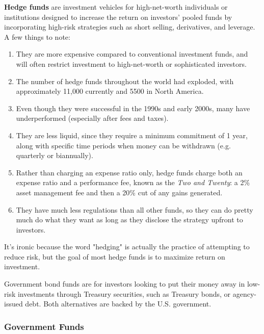 \documentclass{article}
\begin{document}
      \begin{definition}
        \textbf{Hedge funds} are investment vehicles for high-net-worth individuals or institutions designed to increase the return on investors' pooled funds by incorporating high-risk strategies such as short selling, derivatives, and leverage. A few things to note: 
        \begin{enumerate}
          \item They are more expensive compared to conventional investment funds, and will often restrict investment to high-net-worth or sophisticated investors. 
          \item The number of hedge funds throughout the world had exploded, with approximately 11,000 currently and 5500 in North America. 
          \item Even though they were successful in the 1990s and early 2000s, many have underperformed (especially after fees and taxes). 
          \item They are less liquid, since they require a minimum commitment of 1 year, along with specific time periods when money can be withdrawn (e.g. quarterly or biannually). 
          \item Rather than charging an expense ratio only, hedge funds charge both an expense ratio and a performance fee, known as the \textit{Two and Twenty}: a 2\% asset management fee and then a 20\% cut of any gains generated. 
          \item They have much less regulations than all other funds, so they can do pretty much do what they want as long as they disclose the strategy upfront to investors. 
        \end{enumerate}
        It's ironic because the word "hedging" is actually the practice of attempting to reduce risk, but the goal of most hedge funds is to maximize return on investment. 
      \end{definition}

      \begin{definition}
        Government bond funds are for investors looking to put their money away in low-risk investments through Treasury securities, such as Treasury bonds, or agency-issued debt. Both alternatives are backed by the U.S. government. 
      \end{definition}

    \subsubsection{Government Funds}
\end{document}
